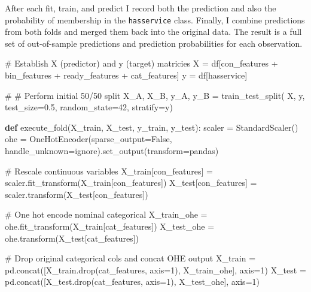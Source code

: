 \documentclass[
]{article}
\newenvironment{Shaded}{\begin{snugshade}}{\end{snugshade}}
\newcommand{\CommentTok}[1]{\textcolor[rgb]{0.37,0.37,0.37}{#1}}
\newcommand{\DecValTok}[1]{\textcolor[rgb]{0.68,0.00,0.00}{#1}}
\newcommand{\FloatTok}[1]{\textcolor[rgb]{0.68,0.00,0.00}{#1}}
\newcommand{\KeywordTok}[1]{\textcolor[rgb]{0.00,0.23,0.31}{\textbf{#1}}}
\newcommand{\NormalTok}[1]{\textcolor[rgb]{0.00,0.23,0.31}{#1}}
\newcommand{\OperatorTok}[1]{\textcolor[rgb]{0.37,0.37,0.37}{#1}}
\newcommand{\StringTok}[1]{\textcolor[rgb]{0.13,0.47,0.30}{#1}}
\newcommand{\VariableTok}[1]{\textcolor[rgb]{0.07,0.07,0.07}{#1}}
\begin{document}
After each fit, train, and predict I record both the prediction and also
the probability of membership in the \texttt{hasservice} class. Finally,
I combine predictions from both folds and merged them back into the
original data. The result is a full set of out-of-sample predictions and
prediction probabilities for each observation.

\begin{Shaded}
\begin{Highlighting}[]
\CommentTok{\# Establish X (predictor) and y (target) matricies}
\NormalTok{X }\OperatorTok{=}\NormalTok{ df[con\_features }\OperatorTok{+}\NormalTok{ bin\_features }\OperatorTok{+}\NormalTok{ ready\_features }\OperatorTok{+}\NormalTok{ cat\_features]}
\NormalTok{y }\OperatorTok{=}\NormalTok{ df[}\StringTok{\textquotesingle{}hasservice\textquotesingle{}}\NormalTok{]}

\CommentTok{\# \# Perform initial 50/50 split}
\NormalTok{X\_A, X\_B, y\_A, y\_B }\OperatorTok{=}\NormalTok{ train\_test\_split(}
\NormalTok{    X, y, test\_size}\OperatorTok{=}\FloatTok{0.5}\NormalTok{, random\_state}\OperatorTok{=}\DecValTok{42}\NormalTok{, stratify}\OperatorTok{=}\NormalTok{y)}

\KeywordTok{def}\NormalTok{ execute\_fold(X\_train, X\_test, y\_train, y\_test):}
\NormalTok{    scaler }\OperatorTok{=}\NormalTok{ StandardScaler()}
\NormalTok{    ohe }\OperatorTok{=}\NormalTok{ OneHotEncoder(sparse\_output}\OperatorTok{=}\VariableTok{False}\NormalTok{, }
\NormalTok{                        handle\_unknown}\OperatorTok{=}\StringTok{\textquotesingle{}ignore\textquotesingle{}}\NormalTok{).set\_output(transform}\OperatorTok{=}\StringTok{\textquotesingle{}pandas\textquotesingle{}}\NormalTok{)}

    \CommentTok{\# Rescale continuous variables}
\NormalTok{    X\_train[con\_features] }\OperatorTok{=}\NormalTok{ scaler.fit\_transform(X\_train[con\_features])}
\NormalTok{    X\_test[con\_features] }\OperatorTok{=}\NormalTok{ scaler.transform(X\_test[con\_features])}

    \CommentTok{\# One hot encode nominal categorical}
\NormalTok{    X\_train\_ohe }\OperatorTok{=}\NormalTok{ ohe.fit\_transform(X\_train[cat\_features])}
\NormalTok{    X\_test\_ohe }\OperatorTok{=}\NormalTok{ ohe.transform(X\_test[cat\_features])}

    \CommentTok{\# Drop original categorical cols and concat OHE output}
\NormalTok{    X\_train }\OperatorTok{=}\NormalTok{ pd.concat([X\_train.drop(cat\_features, axis}\OperatorTok{=}\DecValTok{1}\NormalTok{), X\_train\_ohe], axis}\OperatorTok{=}\DecValTok{1}\NormalTok{)}
\NormalTok{    X\_test }\OperatorTok{=}\NormalTok{ pd.concat([X\_test.drop(cat\_features, axis}\OperatorTok{=}\DecValTok{1}\NormalTok{), X\_test\_ohe], axis}\OperatorTok{=}\DecValTok{1}\NormalTok{)}
    

\end{Highlighting}
\end{Shaded}
\end{document}
